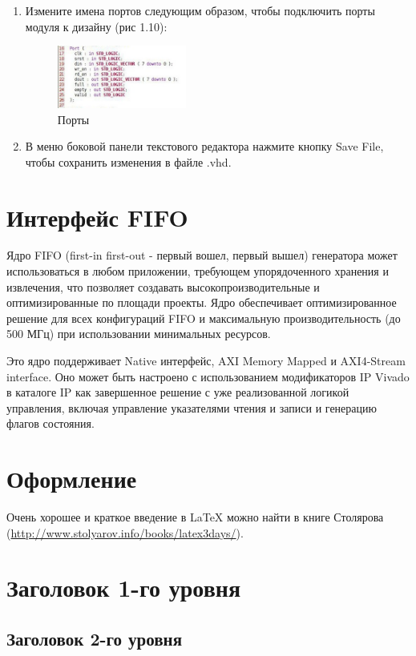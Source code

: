 \begin{enumerate}
\item Измените имена портов следующим образом, чтобы подключить порты модуля к дизайну (рис 1.10):

\begin{figure}[h]
\centering
\includegraphics[width=0.4\textwidth]{fifo_ip_10}
\caption{Порты}
\label{fifo_ip_10_label}
\end{figure}

\item В меню боковой панели текстового редактора нажмите кнопку Save File, чтобы сохранить изменения в файле .vhd.
\end{enumerate}

\section{Интерфейс FIFO}

Ядро FIFO (first-in first-out - первый вошел, первый вышел) генератора может использоваться в любом приложении, требующем упорядоченного
хранения и извлечения, что позволяет создавать высокопроизводительные и оптимизированные по площади проекты.
Ядро обеспечивает оптимизированное решение для всех конфигураций FIFO и  максимальную производительность (до 500 МГц) при использовании
минимальных ресурсов.

Это ядро поддерживает Native интерфейс, AXI Memory Mapped и AXI4-Stream interface.
Оно может быть настроено с использованием модификаторов IP Vivado в каталоге
IP как завершенное решение с уже реализованной логикой управления, включая управление указателями
чтения и записи и генерацию флагов состояния.


\section{Оформление}

Очень хорошее и краткое введение в LaTeX можно найти в книге Столярова (\href{url}{http://www.stolyarov.info/books/latex3days/}).

\section{Заголовок 1-го уровня} 
\subsection{Заголовок 2-го уровня}
